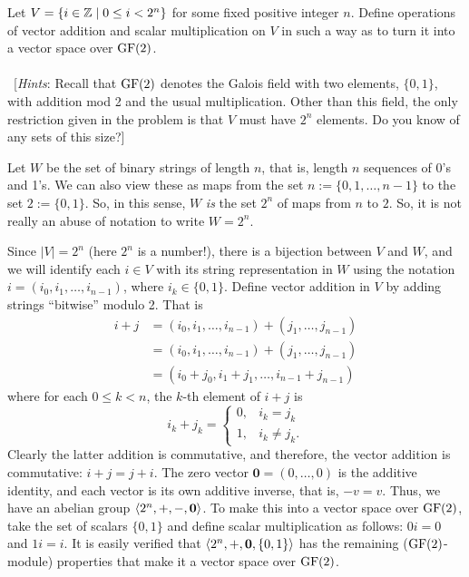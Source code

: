 \begin{problem}[Golan 63]
\label{prob:3}
Let $V = \{ i \in \mathbb{Z} \mid 0 \leq i < 2^n \}$ for some fixed positive integer
$n$.  Define operations of vector addition and scalar multiplication on $V$ in
such a way as to turn it into a vector space over $\operatorname{GF}(2)$.\\
\\
~[{\it Hints}: Recall that $\operatorname{GF}(2)$ denotes the Galois field with two elements,
  $\{0, 1\}$, with addition mod 2 and the usual multiplication.
  Other than this field, the only restriction given in the
  problem is that $V$ must have $2^n$ elements. Do you know of any sets of this size?]
\end{problem}
\smallskip
\begin{solution}
Let $W$ be the set of binary strings of length $n$, that is, length $n$
sequences of 0's and 1's.  We can also view these as maps from the set 
$n := \{0, 1, \dots, n-1\}$ to the set $2 := \{0,1\}$.  So, in this sense, $W$
\emph{is} the set $2^n$ of maps from $n$ to $2$.  So, it is not really an abuse
of notation to write $W = 2^n$.

Since $|V| = 2^n$ (here $2^n$ is a number!), there is a bijection between $V$
and $W$, and we will identify each $i\in V$ with its string representation in $W$ using the notation
$i = (i_0, i_1, \dots, i_{n-1})$, where $i_k \in \{0,1\}$.
Define vector addition in $V$ by adding strings ``bitwise'' modulo 2.  That is
\begin{align*}
i+ j &= (i_0, i_1, \dots, i_{n-1}) + (j_1, \dots, j_{n-1})\\
&= (i_0, i_1, \dots, i_{n-1}) + (j_1, \dots, j_{n-1})\\
&= (i_0+j_0, i_1+j_1, \dots, i_{n-1}+j_{n-1})
\end{align*}
where for each $0\leq k < n$, the $k$-th element of $i+j$ is
\[
i_k + j_k =
\begin{cases}
  0, &i_k = j_k\\
  1, &i_k \neq j_k.
\end{cases}
\]
Clearly the latter addition is commutative, and therefore, the vector addition is
commutative: $i+j = j+i$.  The zero vector $\mathbf{0} = (0, \dots, 0)$ 
is the additive identity, and each vector is its own additive inverse, that is, 
$-v = v$. Thus, we have an abelian group $\langle2^n, +, -, \mathbf{0}\rangle$.   
To make this into a vector space over $\operatorname{GF}(2)$, take 
the set of scalars $\{0, 1\}$ and define scalar multiplication
as follows: $0 i = \mathrm{0}$ and $1 i = i$.  It is easily verified that 
$\langle2^n, +, \mathbf{0}, \{0, 1\}\rangle$ has the remaining ($\operatorname{GF}(2)$-module)
properties that make it a vector space over $\operatorname{GF}(2)$.
\end{solution}
\probskip

